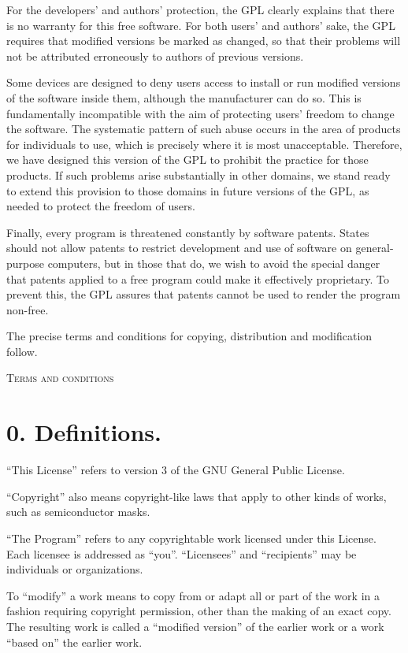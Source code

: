 \documentclass[11pt,a4paper]{article}
\begin{document}
For the developers' and authors' protection, the GPL clearly explains
that there is no warranty for this free software. For both users' and
authors' sake, the GPL requires that modified versions be marked as
changed, so that their problems will not be attributed erroneously to
authors of previous versions.

Some devices are designed to deny users access to install or run
modified versions of the software inside them, although the manufacturer
can do so. This is fundamentally incompatible with the aim of protecting
users' freedom to change the software. The systematic pattern of such
abuse occurs in the area of products for individuals to use, which is
precisely where it is most unacceptable. Therefore, we have designed
this version of the GPL to prohibit the practice for those products. If
such problems arise substantially in other domains, we stand ready to
extend this provision to those domains in future versions of the GPL, as
needed to protect the freedom of users.

Finally, every program is threatened constantly by software patents.
States should not allow patents to restrict development and use of
software on general-purpose computers, but in those that do, we wish to
avoid the special danger that patents applied to a free program could
make it effectively proprietary. To prevent this, the GPL assures that
patents cannot be used to render the program non-free.

The precise terms and conditions for copying, distribution and
modification follow. 
 \clearpage
 \begin{center}
   \textsc{Terms and conditions}
 \end{center}
\part*{0. Definitions.}

“This License” refers to version 3 of the GNU General Public License.

“Copyright” also means copyright-like laws that apply to other kinds of
works, such as semiconductor masks.

“The Program” refers to any copyrightable work licensed under this
License. Each licensee is addressed as “you”. “Licensees” and
“recipients” may be individuals or organizations.

To “modify” a work means to copy from or adapt all or part of the work
in a fashion requiring copyright permission, other than the making of an
exact copy. The resulting work is called a “modified version” of the
earlier work or a work “based on” the earlier work.
\end{document}
